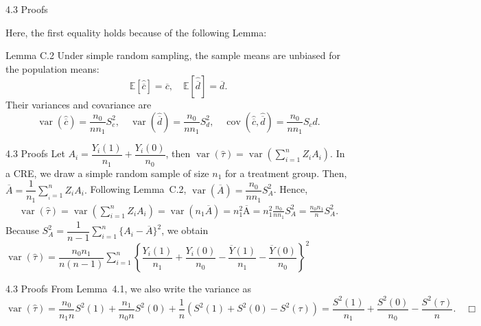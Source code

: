 \documentclass[aspectratio=169, 12pt]{beamer}
\begin{document}
\begin{frame}{4.3 Proofs}

    Here, the first equality holds because of the following Lemma:
    \begin{keybox}{Lemma C.2}
      Under simple random sampling, the sample means are unbiased for the population means:
      \[
      \mathbb{E}\left[\widehat{\overline{c}}\right] = \overline{c}, \quad \mathbb{E}\left[\widehat{\overline{d}}\right] = \overline{d}.
      \]
      Their variances and covariance are
      \[
      \operatorname{var}\left(\widehat{\overline{c}}\right) = \frac{n_0}{nn_1}S_c^2,\quad \operatorname{var}\left(\widehat{\overline{d}}\right) = \frac{n_0}{nn_1}S_d^2, \quad \operatorname{cov}\left(\widehat{\overline{c}}, \widehat{\overline{d}}\right) = \frac{n_0}{nn_1}S_cd.
      \]
    \end{keybox}

\end{frame}

\begin{frame}{4.3 Proofs}
  Let $A_i = \dfrac{Y_i(1)}{n_1}+\dfrac{Y_i(0)}{n_0}$, then $\operatorname{var}(\widehat{\tau}) = \operatorname{var}\left(\sum_{i=1}^{n}Z_iA_i\right)$. In a CRE, we draw a simple random sample of size $n_1$ for a treatment group. Then, $\overline{A} = \dfrac{1}{n_1}\sum_{_i=1}^{n}Z_iA_i.$ Following Lemma~C.2, $\operatorname{var}(\overline{A})=\dfrac{n_0}{nn_1}S_A^2$. Hence, 
  \begin{align*}
    \operatorname{var}(\widehat{\tau}) = \operatorname{var}\left(\sum_{i=1}^{n}Z_iA_i\right) 
    = \operatorname{var}(n_1\overline{A}) = n_1^2\operatorname{\overline{A}}
    = n_1^2 \frac{n_0}{nn_1}S_A^2 = \frac{n_0n_1}{n}S_A^2.
  \end{align*}
  Because $S_A^2 = \dfrac{1}{n-1}\sum_{i=1}^{n}\{A_i-\overline{A}\}^2$, we obtain $\operatorname{var}(\widehat{\tau}) = \dfrac{n_0n_1}{n(n-1)}\sum_{i=1}^{n}\left\{\dfrac{Y_i(1)}{n_1}+\dfrac{Y_i(0)}{n_0}-\dfrac{\overline{Y}(1)}{n_1}-\dfrac{\overline{Y}(0)}{n_0}\right\}^2$
\end{frame}

\begin{frame}{4.3 Proofs}
  From Lemma~4.1, we also write the variance as 
  \[
  \operatorname{var}(\widehat{\tau}) = \frac{n_0}{n_1n}S^2(1) + \frac{n_1}{n_0n}S^2(0) + \frac{1}{n}(S^2(1)+S^2(0)-S^2(\tau)) = \frac{S^2(1)}{n_1} + \frac{S^2(0)}{n_0} - \frac{S^2(\tau)}{n}. \quad \Box
  \]
\end{frame}
\end{document}
